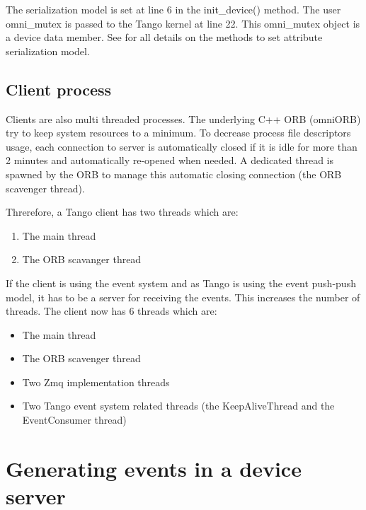 The serialization model is set at line 6 in the init\_device() method.
The user omni\_mutex is passed to the Tango kernel at line 22. This
omni\_mutex object is a device data member. See \cite{TANGO_ref_man}
for all details on the methods to set attribute serialization model.


\subsection{Client process}

Clients are also multi threaded processes. The underlying C++ ORB
(omniORB) try to keep system resources to a minimum. To decrease process
file descriptors usage, each connection to server is automatically
closed if it is idle for more than 2 minutes and automatically re-opened
when needed. A dedicated thread is spawned by the ORB to manage this
automatic closing connection (the ORB scavenger thread).

Threrefore, a Tango client has two threads which are:
\begin{enumerate}
\item The main thread
\item The ORB scavanger thread
\end{enumerate}
If the client is using the event system and as Tango is using the
event push-push model, it has to be a server for receiving the events.
This increases the number of threads. The client now
has 6 threads which are:
\begin{itemize}
\item The main thread
\item The ORB scavenger thread
\item Two Zmq implementation threads
\item Two Tango event system related threads (the KeepAliveThread and the
EventConsumer thread)
\end{itemize}

\section{Generating events in a device server}

